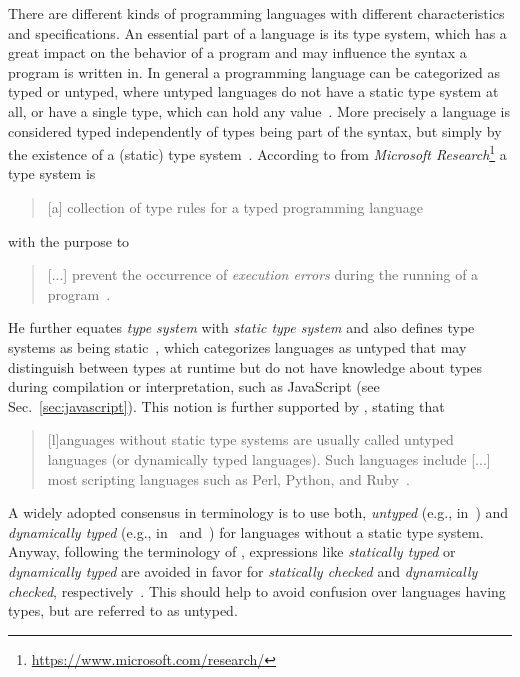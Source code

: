 There are different kinds of programming languages with different characteristics and specifications. An essential part of a language is its type system, which has a great impact on the behavior of a program and may influence the syntax a program is written in.
In general a programming language can be categorized as typed or untyped, where untyped languages do not have a static type system at all, or have a single type, which can hold any value~\cite[p.~2]{TypeSystems:Cardelli:2004}. More precisely a language is considered typed independently of types being part of the syntax, but simply by the existence of a (static) type system~\cite[p.~2]{TypeSystems:Cardelli:2004}.
According to \citeauthor{TypeSystems:Cardelli:2004} from \emph{Microsoft Research}\footnote{\url{https://www.microsoft.com/research/}} a type system is
\begin{quote}
  [a] collection of type rules for a typed programming language~\cite[p.~38]{TypeSystems:Cardelli:2004}
\end{quote}
with the purpose to
\begin{quote}
  [...] prevent the occurrence of \emph{execution errors} during the running of a program~\cite[p.~1]{TypeSystems:Cardelli:2004}.
\end{quote}
He further equates \emph{type system} with \emph{static type system} and also \citeauthor{TypesAndProgrammingLanguages:Pierce:2002} defines type systems as being static~\cite[p.~2]{TypesAndProgrammingLanguages:Pierce:2002}, which categorizes languages as untyped that may distinguish between types at runtime but do not have knowledge about types during compilation or interpretation, such as JavaScript (see Sec.~\ref{sec:javascript}). This notion is further supported by \citeauthor{ProgrammingLanguagesPrinciplesAndPractices:LoudenLambert:2011}, stating that
\begin{quote}
  [l]anguages without static type systems are usually called untyped languages (or dynamically typed languages). Such languages include [...] most scripting languages such as Perl, Python, and Ruby~\cite[p.~331]{ProgrammingLanguagesPrinciplesAndPractices:LoudenLambert:2011}.
\end{quote}
A widely adopted consensus in terminology is to use both, \emph{untyped} (e.g., in~\cite[p.~117]{LogicalTypesForUntypedLanguages:Tobin-Hochstadt:2010}) and \emph{dynamically typed} (e.g., in~\cite[p.~32]{TowardsAProgramLogicForJavaScript:Gardner:2012} and~\cite[p.~203]{TypeSystemsDirectedProgrammingLanguageEvolution:Nino:2012}) for languages without a static type system. Anyway, following the terminology of \citeauthor{TypeSystems:Cardelli:2004}, expressions like \emph{statically typed} or \emph{dynamically typed} are avoided in favor for \emph{statically checked} and \emph{dynamically checked}, respectively~\cite[p.~1]{TypeSystems:Cardelli:2004}. This should help to avoid confusion over languages having types, but are referred to as untyped.

